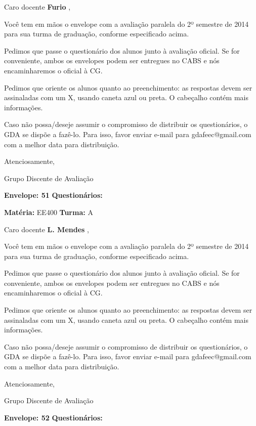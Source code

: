 \documentclass[a5paper]{letter}
\begin{document}
Caro docente {\bf Furio }, 

	Você tem em mãos o envelope com a avaliação paralela do 2º semestre de 2014 para sua turma de graduação, conforme especificado acima.

	Pedimos que passe o questionário dos alunos junto à avaliação oficial. Se for conveniente, ambos os envelopes podem ser entregues no CABS e nós encaminharemos o oficial à CG.

Pedimos que oriente os alunos quanto ao preenchimento: as respostas devem ser assinaladas com um X, usando caneta azul ou preta. O cabeçalho contém mais informações.

	Caso não possa/deseje assumir o compromisso de distribuir os questionários, o GDA se dispõe a fazê-lo. Para isso, favor enviar e-mail para gdafeec@gmail.com com a melhor data para distribuição.


Atenciosamente, 

Grupo Discente de Avaliação

\vspace{0.5cm}

{\bf Envelope: 51 }		\hfill	{\bf Questionários:} \hspace{2cm}

\newpage
\thispagestyle{empty}

\hfill {\bf Matéria:} EE400 {\bf Turma:} A

Caro docente {\bf L. Mendes }, 

	Você tem em mãos o envelope com a avaliação paralela do 2º semestre de 2014 para sua turma de graduação, conforme especificado acima.

	Pedimos que passe o questionário dos alunos junto à avaliação oficial. Se for conveniente, ambos os envelopes podem ser entregues no CABS e nós encaminharemos o oficial à CG.

Pedimos que oriente os alunos quanto ao preenchimento: as respostas devem ser assinaladas com um X, usando caneta azul ou preta. O cabeçalho contém mais informações.

	Caso não possa/deseje assumir o compromisso de distribuir os questionários, o GDA se dispõe a fazê-lo. Para isso, favor enviar e-mail para gdafeec@gmail.com com a melhor data para distribuição.


Atenciosamente, 

Grupo Discente de Avaliação

\vspace{0.5cm}

{\bf Envelope: 52 }		\hfill	{\bf Questionários:} \hspace{2cm}
\end{document}
